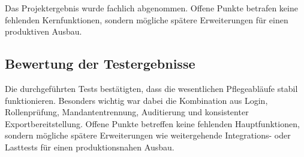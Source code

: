Das Projektergebnis wurde fachlich abgenommen. Offene Punkte betrafen keine
fehlenden Kernfunktionen, sondern mögliche spätere Erweiterungen für einen
produktiven Ausbau.

\subsection{Bewertung der Testergebnisse}
\label{sec:BewertungTestergebnisse}
Die durchgeführten Tests bestätigten, dass die wesentlichen Pflegeabläufe
stabil funktionieren. Besonders wichtig war dabei die Kombination aus Login,
Rollenprüfung, Mandantentrennung, Auditierung und konsistenter
Exportbereitstellung. Offene Punkte betreffen keine fehlenden Hauptfunktionen,
sondern mögliche spätere Erweiterungen wie weitergehende Integrations- oder
Lasttests für einen produktionsnahen Ausbau.
